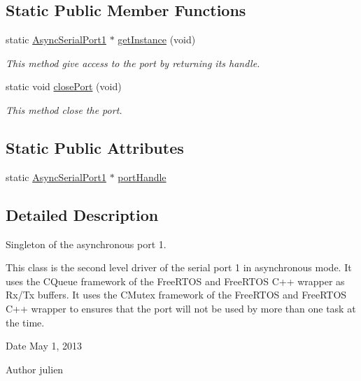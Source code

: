 \subsection*{\-Static \-Public \-Member \-Functions}
\begin{DoxyCompactItemize}
\item 
static \hyperlink{class_async_serial_port1}{\-Async\-Serial\-Port1} $\ast$ \hyperlink{class_async_serial_port1_a1c767b7bdd824c5b3fd4cdaa3dfc2081}{get\-Instance} (void)
\begin{DoxyCompactList}\small\item\em \-This method give access to the port by returning its handle. \end{DoxyCompactList}\item 
static void \hyperlink{class_async_serial_port1_a2dd7f83163710334d2dc5be1e53812be}{close\-Port} (void)
\begin{DoxyCompactList}\small\item\em \-This method close the port. \end{DoxyCompactList}\end{DoxyCompactItemize}
\subsection*{\-Static \-Public \-Attributes}
\begin{DoxyCompactItemize}
\item 
static \hyperlink{class_async_serial_port1}{\-Async\-Serial\-Port1} $\ast$ \hyperlink{class_async_serial_port1_a9661343083970644038cc10ba8e3d0a5}{port\-Handle}
\end{DoxyCompactItemize}


\subsection{\-Detailed \-Description}
\-Singleton of the asynchronous port 1. 

\-This class is the second level driver of the serial port 1 in asynchronous mode. \-It uses the \-C\-Queue framework of the \-Free\-R\-T\-O\-S and \-Free\-R\-T\-O\-S \-C++ wrapper as \-Rx/\-Tx buffers. \-It uses the \-C\-Mutex framework of the \-Free\-R\-T\-O\-S and \-Free\-R\-T\-O\-S \-C++ wrapper to ensures that the port will not be used by more than one task at the time.

\begin{DoxyDate}{\-Date}
\-May 1, 2013 
\end{DoxyDate}
\begin{DoxyAuthor}{\-Author}
julien 
\end{DoxyAuthor}


